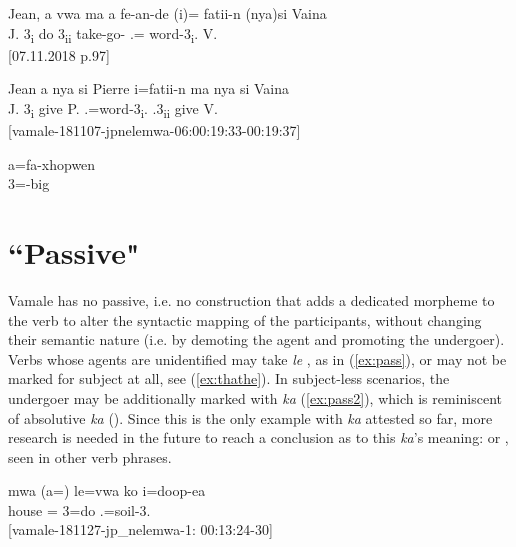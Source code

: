\ea\label{ex:caus_vwa}
\gll Jean, a vwa ma a fe-an-de (i)= fatii-n (nya)si Vaina\\ 
 J. 3\textsubscript{i} do  3\textsubscript{ii} take-go- .= word-3\textsubscript{i}.  V.\\ 
\glt {} {[07.11.2018 p.97]}
\z

\ea\label{ex:nyama}
\gll Jean a nya si Pierre i=fatii-n ma nya si Vaina\\ 
 J. 3\textsubscript{i} give  P.  .=word-3\textsubscript{i}. .3\textsubscript{ii} give  V.\\ 
\glt {} {[vamale-181107-jpnelemwa-06:00:19:33-00:19:37]}
\z

\ea \label{ex:idio_caus}
\label{ex:stat_caus2}
\gll a=fa-xhopwen\\ 
 3=-big\\ 
\glt {}
\z 


\section{``Passive"}
Vamale has no passive, i.e. no construction that adds a dedicated morpheme to the verb to alter the syntactic mapping of the participants, without changing their semantic nature (i.e. by demoting the agent and promoting the undergoer). Verbs whose agents are unidentified may take \textit{le} , as in (\ref{ex:pass}), or may not be marked for subject at all, see (\ref{ex:thathe}). In subject-less scenarios, the undergoer may be additionally marked with \textit{ka} (\ref{ex:pass2}), which is reminiscent of absolutive \textit{ka} (). Since this is the only example with \textit{ka} attested so far, more research is needed in the future to reach a conclusion as to this \textit{ka}'s meaning:  or , seen in other verb phrases. %


\ea\label{ex:pass}
\gll mwa (a=) le=vwa ko i=doop-ea\\ 
 house = 3=do  .=soil-3.\\ 
\glt {} {[vamale-181127-jp\_nelemwa-1: 00:13:24-30]}
\z


